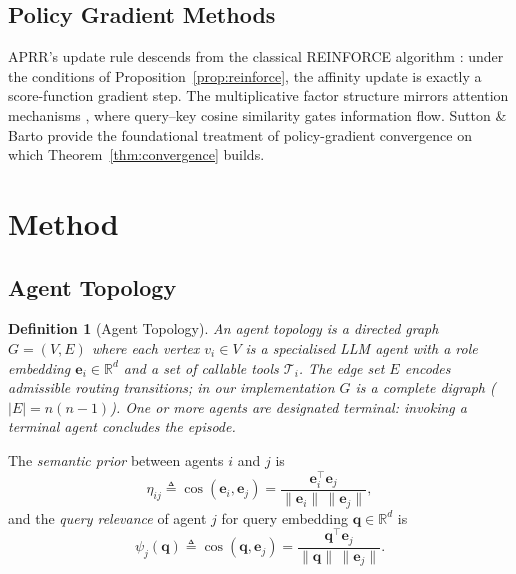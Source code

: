 \documentclass[journal,twocolumn,letterpaper]{IEEEtran}
\newtheorem{definition}{Definition}
\newcommand{\APRR}{\textsc{APRR}}
\newcommand{\RR}{\mathbb{R}}
\newcommand{\defeq}{\triangleq}
\begin{document}
\subsection{Policy Gradient Methods}

\APRR{}'s update rule descends from the classical REINFORCE algorithm
\cite{williams1992reinforce}: under the conditions of
Proposition~\ref{prop:reinforce}, the affinity update is exactly a
score-function gradient step.  The multiplicative factor structure mirrors
attention mechanisms \cite{vaswani2017attention}, where query--key cosine
similarity gates information flow.  Sutton \& Barto \cite{sutton2018rl}
provide the foundational treatment of policy-gradient convergence on which
Theorem~\ref{thm:convergence} builds.

\section{Method}
\label{sec:method}

\subsection{Agent Topology}

\begin{definition}[Agent Topology]
An \emph{agent topology} is a directed graph $G=(V,E)$ where each vertex
$v_i\in V$ is a specialised LLM agent with a role embedding
$\mathbf{e}_i\in\RR^d$ and a set of callable tools $\mathcal{T}_i$.  The edge
set $E$ encodes admissible routing transitions; in our implementation $G$ is a
complete digraph ($|E|=n(n-1)$).  One or more agents are designated
\emph{terminal}: invoking a terminal agent concludes the episode.
\end{definition}

The \emph{semantic prior} between agents $i$ and $j$ is
\begin{equation}
  \eta_{ij} \defeq \cos(\mathbf{e}_i, \mathbf{e}_j)
             = \frac{\mathbf{e}_i^\top \mathbf{e}_j}
                    {\|\mathbf{e}_i\|\,\|\mathbf{e}_j\|},
\label{eq:eta}
\end{equation}
and the \emph{query relevance} of agent $j$ for query embedding
$\mathbf{q}\in\RR^d$ is
\begin{equation}
  \psi_j(\mathbf{q}) \defeq \cos(\mathbf{q}, \mathbf{e}_j)
             = \frac{\mathbf{q}^\top \mathbf{e}_j}
                    {\|\mathbf{q}\|\,\|\mathbf{e}_j\|}.
\label{eq:psi}
\end{equation}
\end{document}
